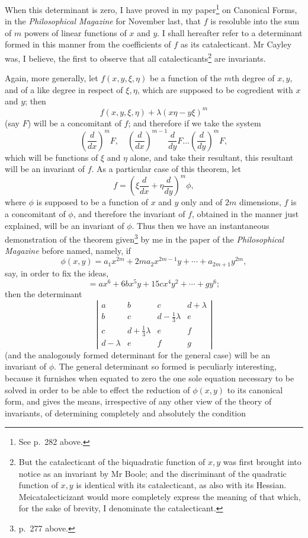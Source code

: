 \documentclass[11pt]{article}
\newcommand{\sourcepage}[1]{\marginpar{\scriptsize p.~#1}}
\begin{document}
{{\sourcepage{293}
When this determinant is zero, I have proved in my paper\footnote{See p.~282 above.} on Canonical Forms, in the \emph{Philosophical Magazine} for November last, that $f$ is resoluble into the sum of $m$ powers of linear functions of $x$ and $y$. I shall hereafter refer to a determinant formed in this manner from the coefficients of $f$ as its catalecticant. Mr Cayley was, I believe, the first to observe that all catalecticants\footnote{But the catalecticant of the biquadratic function of $x,y$ was first brought into notice as an invariant by Mr Boole; and the discriminant of the quadratic function of $x,y$ is identical with its catalecticant, as also with its Hessian. Meicatalecticizant would more completely express the meaning of that which, for the sake of brevity, I denominate the catalecticant.} are invariants.

Again, more generally, let $f(x,y,\xi,\eta)$ be a function of the $m$th degree of $x,y$, and of a like degree in respect of $\xi,\eta$, which are supposed to be cogredient with $x$ and $y$; then
\[
f(x,y,\xi,\eta)+\lambda(x\eta-y\xi)^m
\]
(say $F$) will be a concomitant of $f$; and therefore if we take the system
\[
\left(\frac{d}{dx}\right)^mF,
\quad
\left(\frac{d}{dx}\right)^{m-1}\frac{d}{dy}F\ldots
\left(\frac{d}{dy}\right)^mF,
\]
which will be functions of $\xi$ and $\eta$ alone, and take their resultant, this resultant will be an invariant of $f$. As a particular case of this theorem, let
\[
f=\left(\xi\frac{d}{dx}+\eta\frac{d}{dy}\right)^m\phi,
\]
where $\phi$ is supposed to be a function of $x$ and $y$ only and of $2m$ dimensions, $f$ is a concomitant of $\phi$, and therefore the invariant of $f$, obtained in the manner just explained, will be an invariant of $\phi$. Thus then we have an instantaneous demonstration of the theorem given\footnote{p.~277 above.} by me in the paper of the \emph{Philosophical Magazine} before named, namely, if
\[
\phi(x,y)=a_1x^{2m}+2ma_2x^{2m-1}y+\cdots+a_{2m+1}y^{2m},
\]
say, in order to fix the ideas,
\[
=ax^6+6bx^5y+15cx^4y^2+\cdots+gy^6;
\]
then the determinant
\[
\left|\begin{array}{cccc}
a&b&c&d+\lambda\\
b&c&d-\frac13\lambda&e\\
c&d+\frac13\lambda&e&f\\
d-\lambda&e&f&g
\end{array}\right|
\]
(and the analogously formed determinant for the general case) will be an invariant of $\phi$. The general determinant so formed is peculiarly interesting, because it furnishes when equated to zero the one sole equation necessary to be solved in order to be able to effect the reduction of $\phi(x,y)$ to its canonical form, and gives the means, irrespective of any other view of the theory of invariants, of determining completely and absolutely the condition

}}
\end{document}
